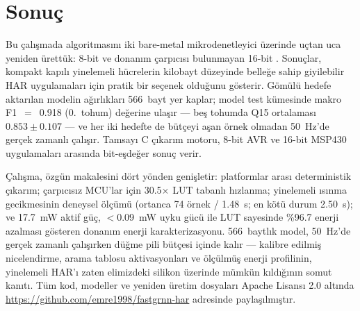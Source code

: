 \section{Sonuç}
\label{sec:conclusion}

Bu çalışmada \fastgrnn{} algoritmasını iki bare-metal
mikrodenetleyici üzerinde uçtan uca yeniden ürettük: 8-bit
\arduino{} ve donanım çarpıcısı bulunmayan 16-bit \msp{}. Sonuçlar,
kompakt kapılı yinelemeli hücrelerin kilobayt düzeyinde belleğe
sahip giyilebilir HAR uygulamaları için pratik bir seçenek olduğunu
gösterir. Gömülü hedefe aktarılan modelin ağırlıkları 566~bayt yer
kaplar; model \hapt{} test kümesinde makro F1~$=$~0.918 (0.~tohum)
değerine ulaşır --- beş tohumda Q15 ortalaması $0.853{\pm}0.107$ ---
ve her iki hedefte de bütçeyi aşan örnek olmadan 50~Hz'de
gerçek zamanlı çalışır. Tamsayı C çıkarım motoru, 8-bit AVR ve
16-bit MSP430 uygulamaları arasında bit-eşdeğer sonuç verir.

Çalışma, özgün \fastgrnn{} makalesini dört yönden genişletir:
platformlar arası deterministik çıkarım; çarpıcısız MCU'lar için
30.5$\times$ LUT tabanlı hızlanma; yinelemeli ısınma gecikmesinin
deneysel ölçümü (ortanca 74 örnek / 1.48~s; en kötü durum 2.50~s);
ve 17.7~mW aktif güç, $<$0.09~mW uyku gücü ile LUT sayesinde
\%96.7 enerji azalması gösteren donanım enerji karakterizasyonu.
566~baytlık model, 50~Hz'de gerçek zamanlı çalışırken düğme pili
bütçesi içinde kalır --- kalibre edilmiş nicelendirme, arama tablosu
aktivasyonları ve ölçülmüş enerji profilinin, yinelemeli HAR'ı zaten
elimizdeki silikon üzerinde mümkün kıldığının somut kanıtı. Tüm
kod, modeller ve yeniden üretim dosyaları Apache Lisansı 2.0 altında
\url{https://github.com/emre1998/fastgrnn-har} adresinde
paylaşılmıştır.
